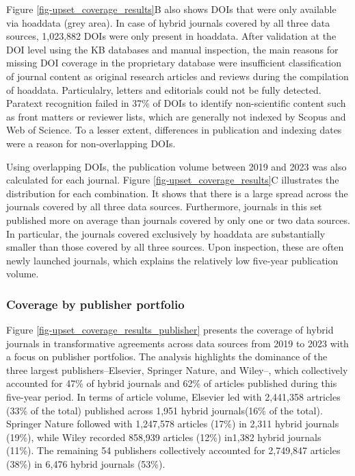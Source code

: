 \documentclass[a4paper,man,floatsintext,longtable,noextraspace,10pt]{apa6}
\begin{document}
Figure \ref{fig-upset_coverage_results}B also shows DOIs that were only
available via hoaddata (grey area). In case of hybrid journals covered
by all three data sources, 1,023,882 DOIs were only present in hoaddata.
After validation at the DOI level using the KB databases and manual
inspection, the main reasons for missing DOI coverage in the proprietary
database were insufficient classification of journal content as original
research articles and reviews during the compilation of hoaddata.
Particulalry, letters and editorials could not be fully detected.
Paratext recognition failed in 37\% of DOIs to identify non-scientific
content such as front matters or reviewer lists, which are generally not
indexed by Scopus and Web of Science. To a lesser extent, differences in
publication and indexing dates were a reason for non-overlapping DOIs.

Using overlapping DOIs, the publication volume between 2019 and 2023 was
also calculated for each journal. Figure
\ref{fig-upset_coverage_results}C illustrates the distribution for each
combination. It shows that there is a large spread across the journals
covered by all three data sources. Furthermore, journals in this set
published more on average than journals covered by only one or two data
sources. In particular, the journals covered exclusively by hoaddata are
substantially smaller than those covered by all three sources. Upon
inspection, these are often newly launched journals, which explains the
relatively low five-year publication volume.

\subsubsection{Coverage by publisher
portfolio}\label{coverage-by-publisher-portfolio}

Figure \ref{fig-upset_coverage_results_publisher} presents the coverage
of hybrid journals in transformative agreements across data sources from
2019 to 2023 with a focus on publisher portfolios. The analysis
highlights the dominance of the three largest publishers--Elsevier,
Springer Nature, and Wiley--, which collectively accounted for 47\% of
hybrid journals and 62\% of articles published during this five-year
period. In terms of article volume, Elsevier led with 2,441,358
artricles (33\% of the total) published across 1,951 hybrid
journals(16\% of the total). Springer Nature followed with 1,247,578
articles (17\%) in 2,311 hybrid journals (19\%), while Wiley recorded
858,939 articles (12\%) in1,382 hybrid journals (11\%). The remaining 54
publishers collectively accounted for 2,749,847 articles (38\%) in 6,476
hybrid journals (53\%).
\end{document}
